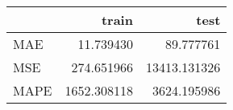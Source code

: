 \begin{tabular}{lrr}
\toprule
{} &        train &          test \\
\midrule
MAE  &    11.739430 &     89.777761 \\
MSE  &   274.651966 &  13413.131326 \\
MAPE &  1652.308118 &   3624.195986 \\
\bottomrule
\end{tabular}

